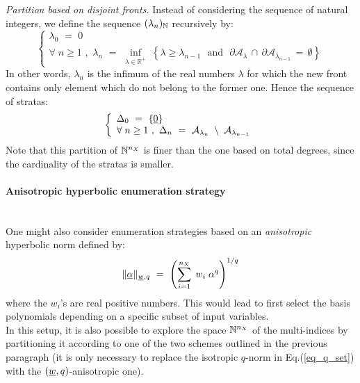 {\textit{Partition based on disjoint fronts. } Instead of considering the sequence of natural integers, we define the sequence $(\lambda_n)_{{\mathbb N}}$ recursively by:
\begin{equation}
  \left\{
\begin{array}{l}
\lambda_0 \, \, = \, \, 0 \\
\forall \; n  \geq  1 \, \, , \, \, \lambda_n \, \, = \, \, 
\inf_{\lambda \in \mathbb{R}^+} \; \left\{ \lambda \geq \lambda_{n-1} \, \, \mbox{ and } \, \,\partial \mathcal{A}_{\lambda} \, \cap \, \partial \mathcal{A}_{\lambda_{n-1}} \, = \, \emptyset \right\}
\end{array}
\right.
\end{equation}
In other words, $\lambda_n$ is the infimum of the real numbers $\lambda$ for which the new front contains only element which do not belong to the former one. Hence the sequence of stratas:
\begin{equation}
  \left\{
\begin{array}{l}
\Delta_0 \, \, = \, \, \{\underline 0\} \\
\forall \; n  \geq  1 \, \, , \, \, \Delta_n \, \, = \, \, \mathcal{A}_{\lambda_n} \; \setminus \; \mathcal{A}_{\lambda_{n-1}} \\
\end{array}
\right.
\end{equation}
Note that this partition of $\mathbb{N}^{n_X}$ is finer than the one based on total degrees, since the cardinality of the stratas is smaller.

\paragraph*{Anisotropic hyperbolic enumeration strategy \\ \\}

One might also consider enumeration strategies based on an \emph{anisotropic} hyperbolic norm defined by:
\begin{equation} 
  \|\underline{\alpha}\|_{\underline w,q} \, \, = \, \, \left(\sum_{i=1}^{n_X} \; w_i\; \alpha^q \right)^{1/q}
\end{equation}
where the $w_i$'s are real positive numbers. This would lead to first select the basis polynomials depending on a specific subset of input variables. \\

In this setup, it is also possible to explore the space $\mathbb{N}^{n_X}$ of the multi-indices by partitioning it according to one of the two schemes outlined in the previous paragraph (it is only necessary to replace the isotropic $q$-norm in Eq.(\ref{eq_q_set}) with the $(\underline w,q)$-anisotropic one). \\

}
